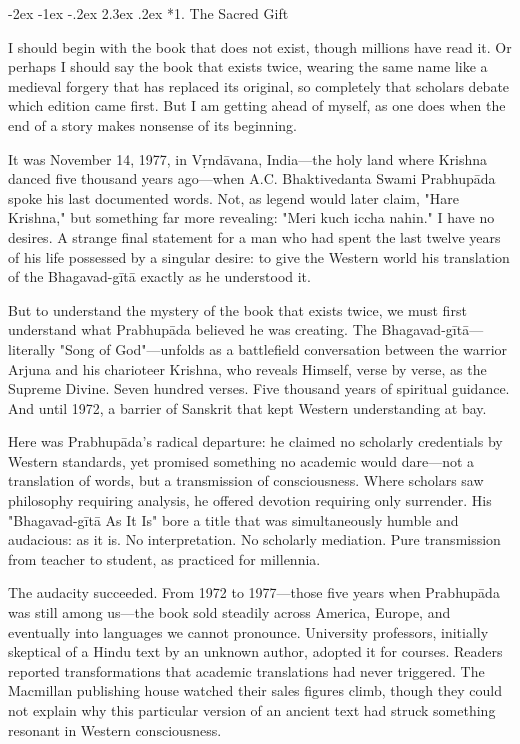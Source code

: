 \documentclass[12pt,twoside]{book}
\makeatletter
\renewcommand\section{\@startsection{section}{1}{\z@}%
{-2ex \@plus -1ex \@minus -.2ex}%
{2.3ex \@plus.2ex}%
{\normalfont\Large\bfseries}}
\makeatother
\begin{document}
\section*{1. The Sacred Gift}
\thispagestyle{chapterpage}

\normalfont\justifying
I should begin with the book that does not exist, though millions have read it. Or perhaps I should say the book that exists twice, wearing the same name like a medieval forgery that has replaced its original, so completely that scholars debate which edition came first. But I am getting ahead of myself, as one does when the end of a story makes nonsense of its beginning.

It was November 14, 1977, in Vṛndāvana, India—the holy land where Krishna danced five thousand years ago—when A.C. Bhaktivedanta Swami Prabhupāda spoke his last documented words. Not, as legend would later claim, "Hare Krishna," but something far more revealing: "Meri kuch iccha nahin." I have no desires. A strange final statement for a man who had spent the last twelve years of his life possessed by a singular desire: to give the Western world his translation of the Bhagavad-gītā exactly as he understood it.

But to understand the mystery of the book that exists twice, we must first understand what Prabhupāda believed he was creating. The Bhagavad-gītā—literally "Song of God"—unfolds as a battlefield conversation between the warrior Arjuna and his charioteer Krishna, who reveals Himself, verse by verse, as the Supreme Divine. Seven hundred verses. Five thousand years of spiritual guidance. And until 1972, a barrier of Sanskrit that kept Western understanding at bay.

Here was Prabhupāda's radical departure: he claimed no scholarly credentials by Western standards, yet promised something no academic would dare—not a translation of words, but a transmission of consciousness. Where scholars saw philosophy requiring analysis, he offered devotion requiring only surrender. His "Bhagavad-gītā As It Is" bore a title that was simultaneously humble and audacious: as it is. No interpretation. No scholarly mediation. Pure transmission from teacher to student, as practiced for millennia.

The audacity succeeded. From 1972 to 1977—those five years when Prabhupāda was still among us—the book sold steadily across America, Europe, and eventually into languages we cannot pronounce. University professors, initially skeptical of a Hindu text by an unknown author, adopted it for courses. Readers reported transformations that academic translations had never triggered. The Macmillan publishing house watched their sales figures climb, though they could not explain why this particular version of an ancient text had struck something resonant in Western consciousness.
\end{document}
